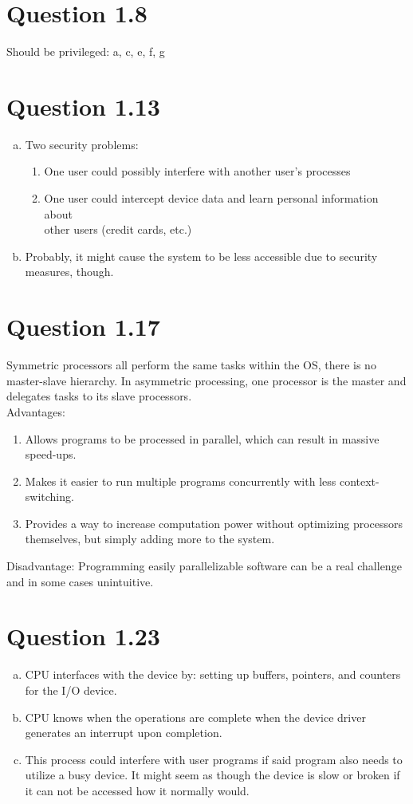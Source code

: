 \documentclass[10pt]{article}
\begin{document}
\section{Question 1.8}
Should be privileged: a, c, e, f, g

\section{Question 1.13}
\begin{enumerate}[a)]
\item Two security problems:
  \begin{enumerate}[1]
  \item One user could possibly interfere with another user's processes
  \item One user could intercept device data and learn personal
    information about \\other users (credit cards, etc.)
  \end{enumerate}
\item Probably, it might cause the system to be less accessible due to
  security measures, though.
\end{enumerate}

\section{Question 1.17}
Symmetric processors all perform the same tasks within the OS, there
is no master-slave hierarchy. In asymmetric processing, one processor
is the master and delegates tasks to its slave processors. \\

\noindent Advantages:
\begin{enumerate}
\item Allows programs to be processed in parallel, which can result in
  massive speed-ups.
\item Makes it easier to run multiple programs concurrently with less
  context-switching.
\item Provides a way to increase computation power without optimizing
  processors themselves, but simply adding more to the system.
\end{enumerate}

\noindent Disadvantage: Programming easily parallelizable software can be a real
challenge and in some cases unintuitive.

\section{Question 1.23}
\begin{enumerate}[a)]
\item CPU interfaces with the device by: setting up buffers, pointers,
  and counters for the I/O device.
\item CPU knows when the operations are complete when the device
  driver generates an interrupt upon completion.
\item This process could interfere with user programs if said program
  also needs to utilize a busy device. It might seem as though the
  device is slow or broken if it can not be accessed how it normally
  would.
\end{enumerate}
\end{document}
